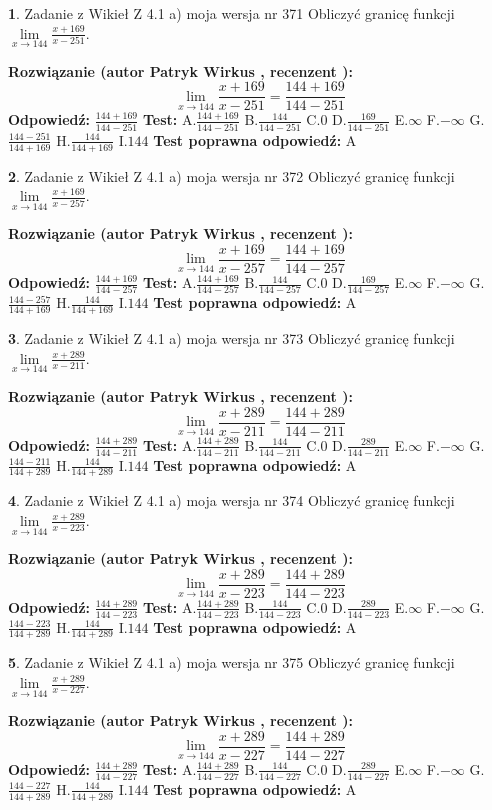\documentclass[12pt, a4paper]{article}
\theoremstyle{definition} %
\newtheorem{zad}{}
\newcommand{\zadStart}[1]{\begin{zad}#1\newline}
\newcommand{\zadStop}{\end{zad}}
\newcommand{\rozwStart}[2]{\noindent \textbf{Rozwiązanie (autor #1 , recenzent #2): }\newline}
\newcommand{\rozwStop}{\newline}
\newcommand{\odpStart}{\noindent \textbf{Odpowiedź:}\newline}
\newcommand{\odpStop}{\newline}
\newcommand{\testStart}{\noindent \textbf{Test:}\newline}
\newcommand{\testStop}{\newline}
\newcommand{\kluczStart}{\noindent \textbf{Test poprawna odpowiedź:}\newline}
\newcommand{\kluczStop}{\newline}
\begin{document}
\zadStart{Zadanie z Wikieł Z 4.1 a) moja wersja nr 371}
Obliczyć granicę funkcji $\lim\limits_{x\to144}\frac{x+169}{x-251}$.
\zadStop
\rozwStart{Patryk Wirkus}{}
$$\lim\limits_{x\to144}\frac{x+169}{x-251} = \frac{144+169}{144-251}$$
\rozwStop
\odpStart
$\frac{144+169}{144-251}$
\odpStop
\testStart
A.$\frac{144+169}{144-251}$
B.$\frac{144}{144-251}$
C.$0$
D.$\frac{169}{144-251}$
E.$\infty$
F.$-\infty$
G.$\frac{144-251}{144+169}$
H.$\frac{144}{144+169}$
I.$144$
\testStop
\kluczStart
A
\kluczStop



\zadStart{Zadanie z Wikieł Z 4.1 a) moja wersja nr 372}
Obliczyć granicę funkcji $\lim\limits_{x\to144}\frac{x+169}{x-257}$.
\zadStop
\rozwStart{Patryk Wirkus}{}
$$\lim\limits_{x\to144}\frac{x+169}{x-257} = \frac{144+169}{144-257}$$
\rozwStop
\odpStart
$\frac{144+169}{144-257}$
\odpStop
\testStart
A.$\frac{144+169}{144-257}$
B.$\frac{144}{144-257}$
C.$0$
D.$\frac{169}{144-257}$
E.$\infty$
F.$-\infty$
G.$\frac{144-257}{144+169}$
H.$\frac{144}{144+169}$
I.$144$
\testStop
\kluczStart
A
\kluczStop



\zadStart{Zadanie z Wikieł Z 4.1 a) moja wersja nr 373}
Obliczyć granicę funkcji $\lim\limits_{x\to144}\frac{x+289}{x-211}$.
\zadStop
\rozwStart{Patryk Wirkus}{}
$$\lim\limits_{x\to144}\frac{x+289}{x-211} = \frac{144+289}{144-211}$$
\rozwStop
\odpStart
$\frac{144+289}{144-211}$
\odpStop
\testStart
A.$\frac{144+289}{144-211}$
B.$\frac{144}{144-211}$
C.$0$
D.$\frac{289}{144-211}$
E.$\infty$
F.$-\infty$
G.$\frac{144-211}{144+289}$
H.$\frac{144}{144+289}$
I.$144$
\testStop
\kluczStart
A
\kluczStop



\zadStart{Zadanie z Wikieł Z 4.1 a) moja wersja nr 374}
Obliczyć granicę funkcji $\lim\limits_{x\to144}\frac{x+289}{x-223}$.
\zadStop
\rozwStart{Patryk Wirkus}{}
$$\lim\limits_{x\to144}\frac{x+289}{x-223} = \frac{144+289}{144-223}$$
\rozwStop
\odpStart
$\frac{144+289}{144-223}$
\odpStop
\testStart
A.$\frac{144+289}{144-223}$
B.$\frac{144}{144-223}$
C.$0$
D.$\frac{289}{144-223}$
E.$\infty$
F.$-\infty$
G.$\frac{144-223}{144+289}$
H.$\frac{144}{144+289}$
I.$144$
\testStop
\kluczStart
A
\kluczStop



\zadStart{Zadanie z Wikieł Z 4.1 a) moja wersja nr 375}
Obliczyć granicę funkcji $\lim\limits_{x\to144}\frac{x+289}{x-227}$.
\zadStop
\rozwStart{Patryk Wirkus}{}
$$\lim\limits_{x\to144}\frac{x+289}{x-227} = \frac{144+289}{144-227}$$
\rozwStop
\odpStart
$\frac{144+289}{144-227}$
\odpStop
\testStart
A.$\frac{144+289}{144-227}$
B.$\frac{144}{144-227}$
C.$0$
D.$\frac{289}{144-227}$
E.$\infty$
F.$-\infty$
G.$\frac{144-227}{144+289}$
H.$\frac{144}{144+289}$
I.$144$
\testStop
\kluczStart
A
\kluczStop
\end{document}
